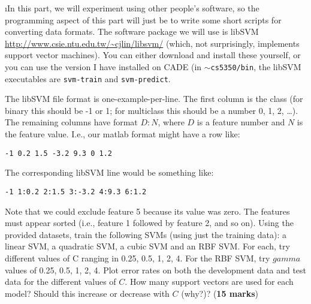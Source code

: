 \documentclass[fleqn]{article}
\begin{document}
\i In this part, we will experiment using other people's software, 
so the programming aspect of this part will just be to write some 
short scripts for converting data formats. The software package we 
will use is libSVM \url{http://www.csie.ntu.edu.tw/~cjlin/libsvm/} 
(which, not surprisingly, implements support vector machines). You 
can either download and install these yourself, or you can use the 
version I have installed on CADE (in \texttt{$\sim$cs5350/bin}, the 
libSVM executables are \texttt{svm-train} and \texttt{svm-predict}.

The libSVM file format is one-example-per-line. The first column is 
the class (for binary this should be -1 or 1; for multiclass this should 
be a number 0, 1, 2, \ldots). The remaining columns have format $D:N$, where
$D$ is a feature number and $N$ is the feature value. I.e., our matlab format 
might have a row like:

\begin{center}
 \texttt{-1 0.2 1.5 -3.2 9.3 0 1.2}
\end{center}

The corresponding libSVM line would be something like:

\begin{center}
 \texttt{-1 1:0.2 2:1.5 3:-3.2 4:9.3 6:1.2}
\end{center}

Note that we could exclude feature 5 because its value was zero. The features 
must appear sorted (i.e., feature 1 followed by feature 2, and so on). Using 
the provided datasets, train the following SVMs (using just the training data): 
a linear SVM, a quadratic SVM, a cubic SVM and an RBF SVM. For each, try different 
values of C ranging in 0.25, 0.5, 1, 2, 4. For the RBF SVM, try $gamma$ values 
of 0.25, 0.5, 1, 2, 4. Plot error rates on both the development data and test 
data for the different values of $C$. How many support vectors are used for each 
model? Should this increase or decrease with $C$ (why?)? (\textbf{15 marks})
\ene
\end{document}
